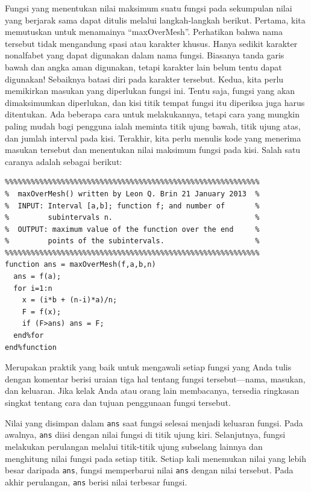 Fungsi yang menentukan nilai maksimum suatu fungsi pada sekumpulan
nilai yang berjarak sama dapat ditulis melalui langkah-langkah berikut.
Pertama, kita memutuskan untuk menamainya ``maxOverMesh''. Perhatikan
bahwa nama tersebut tidak mengandung spasi atau karakter khusus. Hanya
sedikit karakter nonalfabet yang dapat digunakan dalam nama fungsi.
Biasanya tanda garis bawah dan angka aman digunakan, tetapi karakter
lain belum tentu dapat digunakan! Sebaiknya batasi diri pada karakter
tersebut. Kedua, kita perlu memikirkan masukan yang diperlukan fungsi
ini. Tentu saja, fungsi yang akan dimaksimumkan diperlukan, dan kisi
titik tempat fungsi itu diperiksa juga harus ditentukan. Ada beberapa
cara untuk melakukannya, tetapi cara yang mungkin paling mudah bagi
pengguna ialah meminta titik ujung bawah, titik ujung atas, dan jumlah
interval pada kisi. Terakhir, kita perlu menulis kode yang menerima
masukan tersebut dan menentukan nilai maksimum fungsi pada kisi. Salah
satu caranya adalah sebagai berikut: \begin{verbatim}
%%%%%%%%%%%%%%%%%%%%%%%%%%%%%%%%%%%%%%%%%%%%%%%%%%%%%%%%%%%
%  maxOverMesh() written by Leon Q. Brin 21 January 2013  %
%  INPUT: Interval [a,b]; function f; and number of       %
%         subintervals n.                                 %
%  OUTPUT: maximum value of the function over the end     %
%         points of the subintervals.                     %
%%%%%%%%%%%%%%%%%%%%%%%%%%%%%%%%%%%%%%%%%%%%%%%%%%%%%%%%%%% 
function ans = maxOverMesh(f,a,b,n)
  ans = f(a);
  for i=1:n
    x = (i*b + (n-i)*a)/n;
    F = f(x);
    if (F>ans) ans = F;
  end%for
end%function
\end{verbatim}Merupakan praktik yang baik untuk mengawali setiap fungsi yang Anda
tulis dengan komentar berisi uraian tiga hal tentang fungsi tersebut---nama,
masukan, dan keluaran. Jika kelak Anda atau orang lain membacanya,
tersedia ringkasan singkat tentang cara dan tujuan penggunaan fungsi
tersebut.

Nilai yang disimpan dalam \texttt{ans} saat fungsi selesai menjadi
keluaran fungsi. Pada awalnya, \texttt{ans} diisi dengan nilai fungsi
di titik ujung kiri. Selanjutnya, fungsi melakukan perulangan melalui
titik-titik ujung subselang lainnya dan menghitung nilai fungsi pada
setiap titik. Setiap kali menemukan nilai yang lebih besar daripada
\texttt{ans}, fungsi memperbarui nilai \texttt{ans} dengan nilai tersebut.
Pada akhir perulangan, \texttt{ans} berisi nilai terbesar fungsi.

